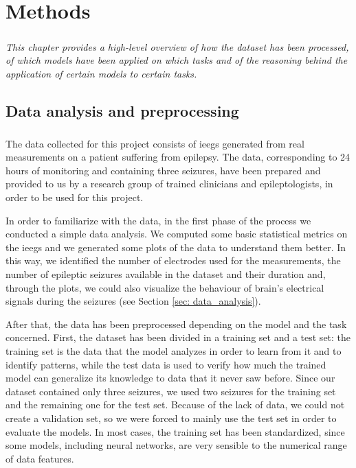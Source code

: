 
\chapter{Methods} \label{chap: methods}

\paragraph{} \textit{This chapter provides a high-level overview of how the dataset has been processed, of which models have been applied on which tasks and of the reasoning behind the application of certain models to certain tasks.}


\section{Data analysis and preprocessing} \label{sec: data_analysis_preprocessing}
\paragraph{} The data collected for this project consists of \acsp{ieeg} generated from real measurements on a patient suffering from epilepsy. The data, corresponding to 24 hours of monitoring and containing three seizures, have been prepared and provided to us by a research group of trained clinicians and epileptologists, in order to be used for this project.

In order to familiarize with the data, in the first phase of the process we conducted a simple data analysis. We computed some basic statistical metrics on the \acsp{ieeg} and we generated some plots of the data to understand them better. In this way, we identified the number of electrodes used for the measurements, the number of epileptic seizures available in the dataset and their duration and, through the plots, we could also visualize the behaviour of brain's electrical signals during the seizures (see Section \ref{sec: data_analysis}).

After that, the data has been preprocessed depending on the model and the task concerned. First, the dataset has been divided in a training set and a test set: the training set is the data that the model analyzes in order to learn from it and to identify patterns, while the test data is used to verify how much the trained model can generalize its knowledge to data that it never saw before. Since our dataset contained only three seizures, we used two seizures for the training set and the remaining one for the test set. Because of the lack of data, we could not create a validation set, so we were forced to mainly use the test set in order to evaluate the models. In most cases, the training set has been standardized, since some models, including neural networks, are very sensible to the numerical range of data features.


